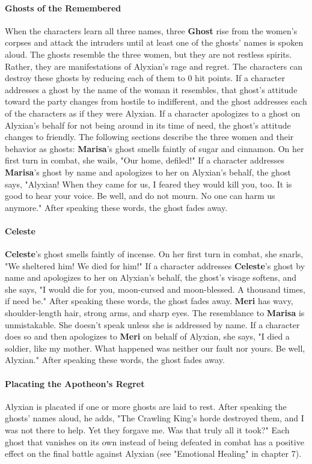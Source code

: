 \documentclass[10pt,a4,twoside,twocolumn,openany,nodeprecatedcode]{dndbook}
\begin{document}
\paragraph{Ghosts of the Remembered}
When the characters learn all three names, three \textbf{Ghost} rise from the women's corpses and attack the intruders until at least one of the ghosts' names is spoken aloud. The ghosts resemble the three women, but they are not restless spirits. Rather, they are manifestations of Alyxian's rage and regret. The characters can destroy these ghosts by reducing each of them to 0 hit points.
If a character addresses a ghost by the name of the woman it resembles, that ghost's attitude toward the party changes from hostile to indifferent, and the ghost addresses each of the characters as if they were Alyxian. If a character apologizes to a ghost on Alyxian's behalf for not being around in its time of need, the ghost's attitude changes to friendly.
The following sections describe the three women and their behavior as ghosts:
{{\textbf{Marisa}'s ghost smells faintly of sugar and cinnamon. On her first turn in combat, she wails, "Our home, defiled!" If a character addresses \textbf{Marisa}'s ghost by name and apologizes to her on Alyxian's behalf, the ghost says, "Alyxian! When they came for us, I feared they would kill you, too. It is good to hear your voice. Be well, and do not mourn. No one can harm us anymore." After speaking these words, the ghost fades away.}}
\paragraph{Celeste}
\textbf{Celeste}'s ghost smells faintly of incense. On her first turn in combat, she snarls, "We sheltered him! We died for him!" If a character addresses \textbf{Celeste}'s ghost by name and apologizes to her on Alyxian's behalf, the ghost's visage softens, and she says, "I would die for you, moon-cursed and moon-blessed. A thousand times, if need be." After speaking these words, the ghost fades away.
{{\textbf{Meri} has wavy, shoulder-length hair, strong arms, and sharp eyes. The resemblance to \textbf{Marisa} is unmistakable. She doesn't speak unless she is addressed by name. If a character does so and then apologizes to \textbf{Meri} on behalf of Alyxian, she says, "I died a soldier, like my mother. What happened was neither our fault nor yours. Be well, Alyxian." After speaking these words, the ghost fades away.}}
\paragraph{Placating the Apotheon's Regret}
Alyxian is placated if one or more ghosts are laid to rest. After speaking the ghosts' names aloud, he adds, "The Crawling King's horde destroyed them, and I was not there to help. Yet they forgave me. Was that truly all it took?"
Each ghost that vanishes on its own instead of being defeated in combat has a positive effect on the final battle against Alyxian (see "Emotional Healing" in chapter 7).
\end{document}
